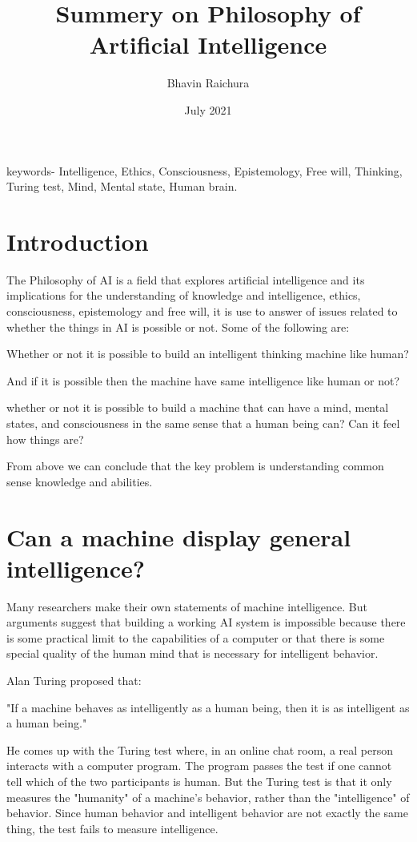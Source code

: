 \documentclass{article}
\title{Summery on Philosophy of  Artificial Intelligence}
\author{Bhavin Raichura}
\date{July 2021}
\begin{document}
\maketitle

\begin{keyword}
keywords- Intelligence, Ethics, Consciousness, Epistemology, Free will, Thinking, Turing test, Mind, Mental state, Human brain.

\end{keyword}

\section{Introduction}
The Philosophy of AI is a field that explores artificial intelligence and its implications for the understanding of knowledge and intelligence, ethics, consciousness, epistemology and free will, it is use to answer of issues related to whether the things in AI is possible or not. Some of the following are:
\item Whether or not it is possible to build an intelligent thinking machine like human? 
\item And if it is possible then the machine have same intelligence like human or not? 
\item whether or not it is possible to build a machine that can have a mind, mental states, and consciousness in the same sense that a human being can? Can it feel how things are?
\item From above we can conclude that the key problem is understanding common sense knowledge and abilities. 



\section{Can a machine display general intelligence?}
Many researchers make their own statements of machine intelligence. But arguments suggest that building a working AI system is impossible because there is some practical limit to the capabilities of a computer or that there is some special quality of the human mind that is necessary for intelligent behavior.

\item Alan Turing proposed that: 

"If a machine behaves as intelligently as a human being, then it is as intelligent as a human being."

He comes up with the Turing test where, in an online chat room, a real person interacts with a computer program. The program passes the test if one cannot tell which of the two participants is human.
But the Turing test is that it only measures the "humanity" of a machine's behavior, rather than the "intelligence" of behavior. Since human behavior and intelligent behavior are not exactly the same thing, the test fails to measure intelligence.
\end{document}
